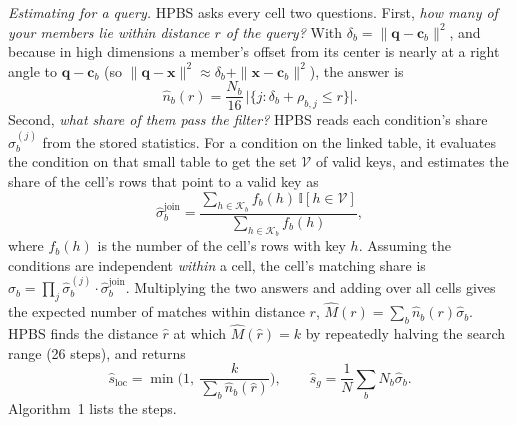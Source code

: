 \documentclass[sigconf,nonacm]{acmart}
\begin{document}
\emph{Estimating for a query.} HPBS asks every cell two questions. First, \emph{how many of your members lie within distance $r$ of the query?} With $\delta_b=\|\mathbf{q}-\mathbf{c}_b\|^2$, and because in high dimensions a member's offset from its center is nearly at a right angle to $\mathbf{q}-\mathbf{c}_b$ (so $\|\mathbf{q}-\mathbf{x}\|^2\approx\delta_b+\|\mathbf{x}-\mathbf{c}_b\|^2$), the answer is
\begin{equation}\label{eq:ballcount}
\hat n_b(r) = \frac{N_b}{16}\,\big|\{j : \delta_b + \rho_{b,j} \le r\}\big|.
\end{equation}
Second, \emph{what share of them pass the filter?} HPBS reads each condition's share $\hat\sigma^{(j)}_b$ from the stored statistics. For a condition on the linked table, it evaluates the condition on that small table to get the set $\mathcal{V}$ of valid keys, and estimates the share of the cell's rows that point to a valid key as
\begin{equation}\label{eq:kmv_join}
\hat\sigma^{\text{join}}_b = \frac{\sum_{h\in\mathcal{K}_b} f_b(h)\,\mathbb{I}[h\in\mathcal{V}]}{\sum_{h\in\mathcal{K}_b} f_b(h)},
\end{equation}
where $f_b(h)$ is the number of the cell's rows with key $h$. Assuming the conditions are independent \emph{within} a cell, the cell's matching share is $\hat\sigma_b=\prod_j\hat\sigma^{(j)}_b\cdot\hat\sigma^{\text{join}}_b$. Multiplying the two answers and adding over all cells gives the expected number of matches within distance $r$, $\hat M(r)=\sum_b\hat n_b(r)\hat\sigma_b$. HPBS finds the distance $\hat r$ at which $\hat M(\hat r)=k$ by repeatedly halving the search range (26 steps), and returns
\begin{equation}\label{eq:sloc_hat}
\hat s_{\text{loc}} = \min\!\Big(1,\ \frac{k}{\sum_b \hat n_b(\hat r)}\Big), \qquad \hat s_g = \frac{1}{N}\sum_b N_b\hat\sigma_b .
\end{equation}
Algorithm~1 lists the steps.
\end{document}

